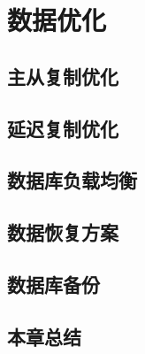 \chapter{数据优化}
\label{cha:Database}
\section{主从复制优化}
\section{延迟复制优化}
\section{数据库负载均衡}
\section{数据恢复方案}
\section{数据库备份}
\section{本章总结}
